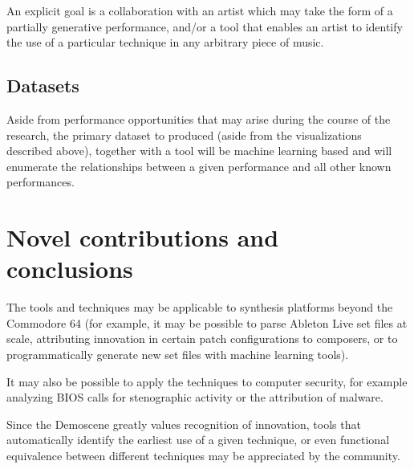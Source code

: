 \documentclass[10pt]{article}
\begin{document}
\begin{multicols*}{2}
  An explicit goal is a collaboration with an artist which may take
  the form of a partially generative performance, and/or a tool that
  enables an artist to identify the use of a particular technique in any
  arbitrary piece of music.

  \subsection{Datasets}
  Aside from performance opportunities that may arise during the
  course of the research, the primary dataset to produced (aside from
  the visualizations described above), together with a tool will
  be machine learning based and will enumerate the relationships
  between a given performance and all other known performances.

\section{Novel contributions and conclusions}

The tools and techniques may be applicable to synthesis platforms
beyond the Commodore 64 (for example, it may be possible to parse
Ableton Live set files at scale, attributing innovation in certain
patch configurations to composers, or to programmatically generate new
set files with machine learning tools).

It may also be possible to apply the techniques to computer
security, for example analyzing BIOS calls for stenographic
activity or the attribution of malware.

Since the Demoscene greatly values recognition of innovation, tools
that automatically identify the earliest use of a given technique,
or even functional equivalence between different techniques may
be appreciated by the community.

\clearpage


\end{multicols*}

\nocite{*}


\end{document}
